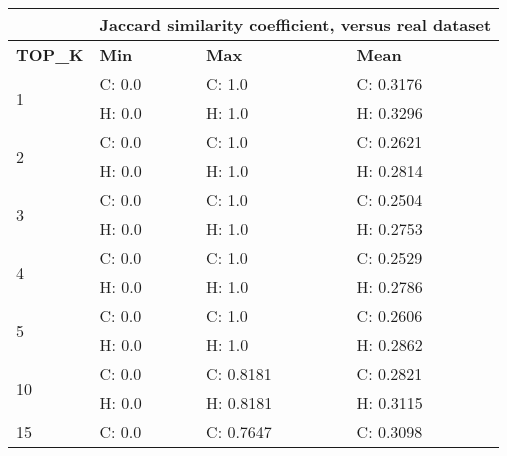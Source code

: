 \begin{table}[]
\begin{tabular}{l|lll|}
\cline{2-4}
                                          & \multicolumn{3}{l|}{Jaccard similarity coefficient, versus real dataset}    \\ \hline
\multicolumn{1}{|l|}{\textbf{TOP\_K}}              & \multicolumn{1}{l|}{\textbf{Min}}       & \multicolumn{1}{l|}{\textbf{Max}}       & \textbf{Mean}      \\ \hline
\multicolumn{1}{|l|}{\multirow{2}{*}{1}}  & \multicolumn{1}{l|}{C: 0.0}    & \multicolumn{1}{l|}{C: 1.0}    & C: 0.3176 \\ \cline{2-4} 
\multicolumn{1}{|l|}{}                    & \multicolumn{1}{l|}{H: 0.0}    & \multicolumn{1}{l|}{H: 1.0}    & H: 0.3296 \\ \hline
\multicolumn{1}{|l|}{\multirow{2}{*}{2}}  & \multicolumn{1}{l|}{C: 0.0}    & \multicolumn{1}{l|}{C: 1.0}    & C: 0.2621 \\ \cline{2-4} 
\multicolumn{1}{|l|}{}                    & \multicolumn{1}{l|}{H: 0.0}    & \multicolumn{1}{l|}{H: 1.0}    & H: 0.2814 \\ \hline
\multicolumn{1}{|l|}{\multirow{2}{*}{3}}  & \multicolumn{1}{l|}{C: 0.0}    & \multicolumn{1}{l|}{C: 1.0}    & C: 0.2504 \\ \cline{2-4} 
\multicolumn{1}{|l|}{}                    & \multicolumn{1}{l|}{H: 0.0}    & \multicolumn{1}{l|}{H: 1.0}    & H: 0.2753 \\ \hline
\multicolumn{1}{|l|}{\multirow{2}{*}{4}}  & \multicolumn{1}{l|}{C: 0.0}    & \multicolumn{1}{l|}{C: 1.0}    & C: 0.2529 \\ \cline{2-4} 
\multicolumn{1}{|l|}{}                    & \multicolumn{1}{l|}{H: 0.0}    & \multicolumn{1}{l|}{H: 1.0}    & H: 0.2786 \\ \hline
\multicolumn{1}{|l|}{\multirow{2}{*}{5}}  & \multicolumn{1}{l|}{C: 0.0}    & \multicolumn{1}{l|}{C: 1.0}    & C: 0.2606 \\ \cline{2-4} 
\multicolumn{1}{|l|}{}                    & \multicolumn{1}{l|}{H: 0.0}    & \multicolumn{1}{l|}{H: 1.0}    & H: 0.2862 \\ \hline
\multicolumn{1}{|l|}{\multirow{2}{*}{10}} & \multicolumn{1}{l|}{C: 0.0}    & \multicolumn{1}{l|}{C: 0.8181} & C: 0.2821 \\ \cline{2-4} 
\multicolumn{1}{|l|}{}                    & \multicolumn{1}{l|}{H: 0.0}    & \multicolumn{1}{l|}{H: 0.8181} & H: 0.3115 \\ \hline
\multicolumn{1}{|l|}{\multirow{2}{*}{15}} & \multicolumn{1}{l|}{C: 0.0}    & \multicolumn{1}{l|}{C: 0.7647} & C: 0.3098 \\ \cline{2-4} 

\end{tabular}
\end{table}
